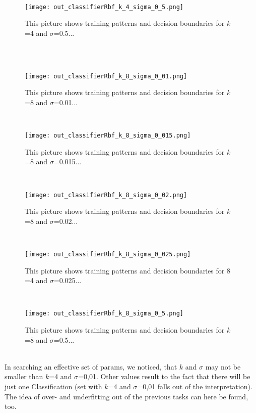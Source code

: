 \documentclass[a4paper,headings=small]{scrartcl}
\begin{document}
\\
\begin{figure}[htbp]
\centering
\texttt{[image: out\_classifierRbf\_k\_4\_sigma\_0\_5.png]}
\caption{This picture shows training patterns and decision boundaries for $k$=4 and $\sigma$=0.5...}
\label{fig:out_classifierRbf_k_4_sigma_0.5}
\end{figure}
\\
\\
\begin{figure}[htbp]
\centering
\texttt{[image: out\_classifierRbf\_k\_8\_sigma\_0\_01.png]}
\caption{This picture shows training patterns and decision boundaries for $k$=8 and $\sigma$=0.01...}
\label{fig:out_classifierRbf_k_8_sigma_0.01}
\end{figure}
\\
\begin{figure}[htbp]
\centering
\texttt{[image: out\_classifierRbf\_k\_8\_sigma\_0\_015.png]}
\caption{This picture shows training patterns and decision boundaries for $k$=8 and $\sigma$=0.015...}
\label{fig:out_classifierRbf_k_8_sigma_0.015}
\end{figure}
\\
\begin{figure}[htbp]
\centering
\texttt{[image: out\_classifierRbf\_k\_8\_sigma\_0\_02.png]}
\caption{This picture shows training patterns and decision boundaries for $k$=8 and $\sigma$=0.02...}
\label{fig:out_classifierRbf_k_8_sigma_0.02}
\end{figure}
\\
\begin{figure}[htbp]
\centering
\texttt{[image: out\_classifierRbf\_k\_8\_sigma\_0\_025.png]}
\caption{This picture shows training patterns and decision boundaries for $8$=4 and $\sigma$=0.025...}
\label{fig:out_classifierRbf_k_8_sigma_0.025}
\end{figure}
\\
\begin{figure}[htbp]
\centering
\texttt{[image: out\_classifierRbf\_k\_8\_sigma\_0\_5.png]}
\caption{This picture shows training patterns and decision boundaries for $k$=8 and $\sigma$=0.5...}
\label{fig:out_classifierRbf_k_8_sigma_0.5}
\end{figure}
\\
In searching an effective set of params, we noticed, that $k$ and $\sigma$ may not be smaller than $k$=4 and $\sigma$=0,01. Other values result to the fact that there will be just one Classification (set with $k$=4 and $\sigma$=0,01 falls out of the interpretation). The idea of over- and underfitting out of the previous tasks can here be found, too.
\end{document}
